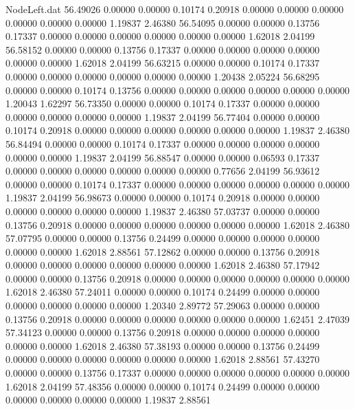 \begin{filecontents}{NodeLeft.dat}
  56.49026    0.00000    0.00000     0.10174    0.20918    0.00000    0.00000    0.00000    0.00000    0.00000    0.00000    1.19837    2.46380
  56.54095    0.00000    0.00000     0.13756    0.17337    0.00000    0.00000    0.00000    0.00000    0.00000    0.00000    1.62018    2.04199
  56.58152    0.00000    0.00000     0.13756    0.17337    0.00000    0.00000    0.00000    0.00000    0.00000    0.00000    1.62018    2.04199
  56.63215    0.00000    0.00000     0.10174    0.17337    0.00000    0.00000    0.00000    0.00000    0.00000    0.00000    1.20438    2.05224
  56.68295    0.00000    0.00000     0.10174    0.13756    0.00000    0.00000    0.00000    0.00000    0.00000    0.00000    1.20043    1.62297
  56.73350    0.00000    0.00000     0.10174    0.17337    0.00000    0.00000    0.00000    0.00000    0.00000    0.00000    1.19837    2.04199
  56.77404    0.00000    0.00000     0.10174    0.20918    0.00000    0.00000    0.00000    0.00000    0.00000    0.00000    1.19837    2.46380
  56.84494    0.00000    0.00000     0.10174    0.17337    0.00000    0.00000    0.00000    0.00000    0.00000    0.00000    1.19837    2.04199
  56.88547    0.00000    0.00000     0.06593    0.17337    0.00000    0.00000    0.00000    0.00000    0.00000    0.00000    0.77656    2.04199
  56.93612    0.00000    0.00000     0.10174    0.17337    0.00000    0.00000    0.00000    0.00000    0.00000    0.00000    1.19837    2.04199
  56.98673    0.00000    0.00000     0.10174    0.20918    0.00000    0.00000    0.00000    0.00000    0.00000    0.00000    1.19837    2.46380
  57.03737    0.00000    0.00000     0.13756    0.20918    0.00000    0.00000    0.00000    0.00000    0.00000    0.00000    1.62018    2.46380
  57.07795    0.00000    0.00000     0.13756    0.24499    0.00000    0.00000    0.00000    0.00000    0.00000    0.00000    1.62018    2.88561
  57.12862    0.00000    0.00000     0.13756    0.20918    0.00000    0.00000    0.00000    0.00000    0.00000    0.00000    1.62018    2.46380
  57.17942    0.00000    0.00000     0.13756    0.20918    0.00000    0.00000    0.00000    0.00000    0.00000    0.00000    1.62018    2.46380
  57.24011    0.00000    0.00000     0.10174    0.24499    0.00000    0.00000    0.00000    0.00000    0.00000    0.00000    1.20340    2.89772
  57.29063    0.00000    0.00000     0.13756    0.20918    0.00000    0.00000    0.00000    0.00000    0.00000    0.00000    1.62451    2.47039
  57.34123    0.00000    0.00000     0.13756    0.20918    0.00000    0.00000    0.00000    0.00000    0.00000    0.00000    1.62018    2.46380
  57.38193    0.00000    0.00000     0.13756    0.24499    0.00000    0.00000    0.00000    0.00000    0.00000    0.00000    1.62018    2.88561
  57.43270    0.00000    0.00000     0.13756    0.17337    0.00000    0.00000    0.00000    0.00000    0.00000    0.00000    1.62018    2.04199
  57.48356    0.00000    0.00000     0.10174    0.24499    0.00000    0.00000    0.00000    0.00000    0.00000    0.00000    1.19837    2.88561
\end{filecontents}
